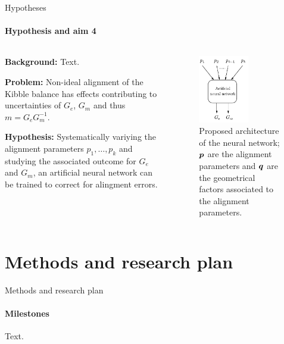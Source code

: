 \documentclass{beamer}
\begin{document}
\begin{frame}[allowframebreaks]{Hypotheses}
  \framesubtitle{Hypothesis and aim 4}

  \begin{columns}
    \begin{column}{0.59\textwidth}
\textbf{Background:} Text.

\textbf{Problem:} Non-ideal alignment of the Kibble balance has effects contributing to uncertainties of $G_e$, $G_m$ and thus $m=G_eG_m^{-1}$.

\textbf{Hypothesis:} Systematically variying the alignment parameters $p_1,\dots,p_k$ and studying the associated outcome for $G_e$ and $G_m$, an artificial neural network can be trained to correct for alingment errors.
    \end{column}
    
    \begin{column}{0.4\textwidth}
      \begin{figure}[h!] 
	\centering
	\includegraphics[width=0.6\textwidth]{figures/nn.pdf}
	\caption{Proposed architecture of the neural network; $\bm{p}$ are the alignment parameters and $\bm{q}$ are the geometrical factors associated to the alignment parameters.}
	\label{fig:nn}
      \end{figure}
    \end{column}
  \end{columns}
\end{frame}

\section{Methods and research plan}
\begin{frame}[allowframebreaks]{Methods and research plan}
  \framesubtitle{Milestones}
    Text.
\end{frame}
\end{document}
